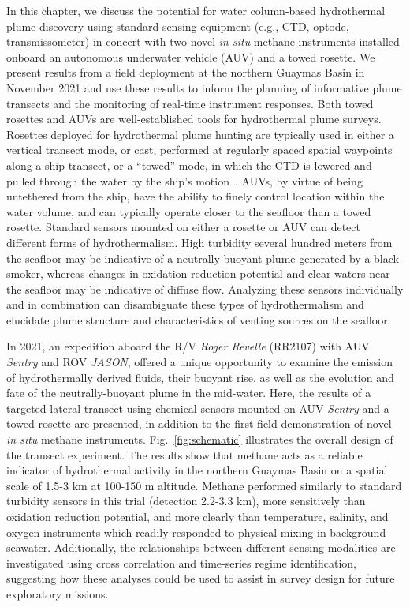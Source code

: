 In this chapter, we discuss the potential for water column-based hydrothermal plume discovery using standard sensing equipment (e.g., CTD, optode, transmissometer) in concert with two novel \emph{in situ} methane instruments installed onboard an autonomous underwater vehicle (AUV) and a towed rosette. We present results from a field deployment at the northern Guaymas Basin in November 2021 and use these results to inform the planning of informative plume transects and the monitoring of real-time instrument responses. Both towed rosettes and AUVs are well-established tools for hydrothermal plume surveys. Rosettes deployed for hydrothermal plume hunting are typically used in either a vertical transect mode, or cast, performed at regularly spaced spatial waypoints along a ship transect, or a ``towed'' mode, in which the CTD is lowered and pulled through the water by the ship’s motion~\autocite{chin1994situ, bennett2013trophic}. AUVs, by virtue of being untethered from the ship, have the ability to finely control location within the water volume, and can typically operate closer to the seafloor than a towed rosette. Standard sensors mounted on either a rosette or AUV can detect different forms of hydrothermalism. High turbidity several hundred meters from the seafloor may be indicative of a neutrally-buoyant plume generated by a black smoker, whereas changes in oxidation-reduction potential and clear waters near the seafloor may be indicative of diffuse flow. Analyzing these sensors individually and in combination can disambiguate these types of hydrothermalism and elucidate plume structure and characteristics of venting sources on the seafloor.

In 2021, an expedition aboard the R/V \emph{Roger Revelle} (RR2107) with AUV \emph{Sentry} and ROV \emph{JASON}, offered a unique opportunity to examine the emission of hydrothermally derived fluids, their buoyant rise, as well as the evolution and fate of the neutrally-buoyant plume in the mid-water. Here, the results of a targeted lateral transect using chemical sensors mounted on AUV \emph{Sentry} and a towed rosette are presented, in addition to the first field demonstration of novel \emph{in situ} methane instruments. Fig.~\ref{fig:schematic} illustrates the overall design of the transect experiment. The results show that methane acts as a reliable indicator of hydrothermal activity in the northern Guaymas Basin on a spatial scale of 1.5-3 km at 100-150 m altitude. Methane performed similarly to standard turbidity sensors in this trial (detection 2.2-3.3 km), more sensitively than oxidation reduction potential, and more clearly than temperature, salinity, and oxygen instruments which readily responded to physical mixing in background seawater. Additionally, the relationships between different sensing modalities are investigated using  cross correlation and time-series regime identification, suggesting how these analyses could be used to assist in survey design for future exploratory missions. 

